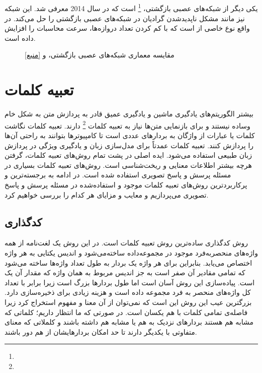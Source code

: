 \subsection{}
	یکی دیگر از شبکه‌های عصبی بازگشتی، 
	\footnote{}
	است که در سال 2014 معرفی شد. این شبکه نیز مانند 
	مشکل ناپدیدشدن گرادیان در شبکه‌های عصبی بازگشتی را حل می‌کند. در واقع 
	نوع خاصی از 
	است که با کم کردن تعداد دروازه‌ها، سرعت محاسبات را افزایش داده است.
	 \begin{figure}
	 	\caption[مقایسه معماری شبکه‌‌های عصبی بازگشتی،  و ]{مقایسه معماری شبکه‌‌های عصبی بازگشتی،  و  \href{http://dprogrammer.org/rnn-lstm-gru}{[منبع]}}
	 	\label{fig:RNN-LSTM-GRU}
	 \end{figure}

\section{تعبیه کلمات}
	بیشتر الگوریتم‌های یادگیری ماشین و یادگیری عمیق  قادر به پردازش متن به شکل خام وساده نیستند  و برای بازنمایی متن‌ها نیاز به تعبیه کلمات 
	\footnote{}
	دارند. تعبیه کلمات نگاشت کلمات یا عبارات از واژگان به بردارهای عددی است تا کامپیوترها بتوانند به راحتی آن‌ها را پردازش کنند. تعبیه کلمات عمدتاً برای مدل‌سازی زبان و یادگیری ویژگی در پردازش زبان طبیعی استفاده می‌شود. ایده اصلی در پشت تمام روش‌های تعبیه کلمات، گرفتن هرچه بیشتر اطلاعات معنایی و ریخت‌شناسی است. روش‌های تعبیه کلمات بسیاری در مسئله پرسش و پاسخ تصویری استفاده شده است. در ادامه به برجسته‌ترین و پرکاربردترین روش‌های تعبیه کلمات موجود و استفاده‌شده در مسئله پرسش و پاسخ تصویری می‌پردازیم و معایب و مزایای هر کدام را بررسی خواهیم کرد.
\subsection{کدگذاری }
	روش کدگذاری
	ساده‌ترین روش تعبیه کلمات است. در این روش یک لغت‌‌نامه از همه واژه‌های منحصربه‌فرد موجود در مجموعه‌داده ساخته‌می‌شود و اندیس یکتایی به هر واژه اختصاص می‌یابد. بنابراین برای هر واژه یک بردار به طول تعداد واژ‌ه‌ها ساخته می‌شود که تمامی مقادیر آن صفر است به جز اندیس مربوط به همان واژه که مقدار آن یک است. پیاده‌سازی این روش آسان است اما طول بردارها  بزرگ است زیرا برابر با تعداد کل واژه‌های منحصر به فرد مجموعه داده است و هزینه زیادی برای ذخیره‌سازی دارد. بزرگترین عیب این روش  این است که نمی‌توان از آن معنا  و مفهوم استخراج کرد زیرا فاصله‌ی تمامی کلمات با هم یکسان است. در صورتی که ما انتظار داریم؛ کلماتی که مشابه هم هستند بردارهای نزدیک به هم یا مشابه هم داشته باشند و کلملاتی که معنای متفاوتی با یکدیگر دارند تا حد امکان بردارهایشان از هم دور باشند. 


